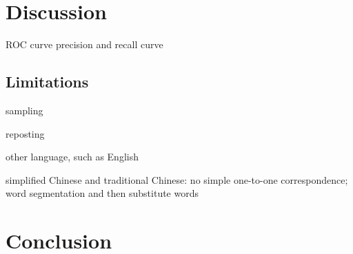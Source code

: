 \documentclass[11pt]{article}
\newcommand{\1}[1]{{\mathbf 1}\left\{#1\right\}}        %
\begin{document}
\section{Discussion}

ROC curve
precision and recall curve

\subsection{Limitations}

sampling \cite{boyd2004fastest} \cite{leskovec2006sampling}  \cite{wang2011understanding}

reposting

other language, such as English

simplified Chinese and traditional Chinese: no simple one-to-one correspondence; word segmentation and then substitute words



\section{Conclusion}



%


\newpage






%
\end{document}
